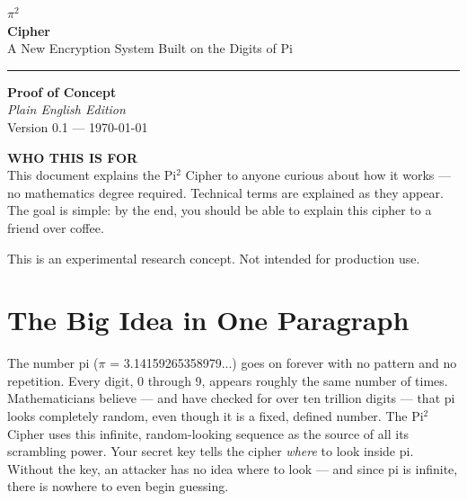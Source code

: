 \documentclass[12pt, a4paper]{article}
\begin{document}

\begin{titlepage}
\centering
\vspace*{1.8cm}

{\fontsize{52}{60}\selectfont $\pi^2$}\\[0.5em]
{\Huge\bfseries\color{pigreen} Cipher}\\[0.7em]
{\large\color{pigray} A New Encryption System Built on the Digits of Pi}

\vspace{1.2cm}
\textcolor{piborder}{\rule{0.55\linewidth}{1pt}}
\vspace{1.2cm}

{\large\textbf{Proof of Concept}}\\[0.4em]
{\large\textit{Plain English Edition}}\\[0.8em]
{\color{pigray} Version 0.1 — \today}

\vspace{1.8cm}

\begin{amberbox}
\centering\small\color{piamber}
\textbf{WHO THIS IS FOR}\\[0.4em]
\color{pigray}
This document explains the Pi$^2$ Cipher to anyone curious about how it works ---
no mathematics degree required. Technical terms are explained as they appear.
The goal is simple: by the end, you should be able to explain this cipher
to a friend over coffee.
\end{amberbox}

\vfill
{\small\color{pigray}
This is an experimental research concept. Not intended for production use.
}
\end{titlepage}

\tableofcontents
\newpage

\section{The Big Idea in One Paragraph}

\vspace{0.5em}

The number pi ($\pi$ = 3.14159265358979...) goes on forever with no pattern and no repetition. Every digit, 0 through 9, appears roughly the same number of times. Mathematicians believe --- and have checked for over ten trillion digits --- that pi looks completely random, even though it is a fixed, defined number. The Pi$^2$ Cipher uses this infinite, random-looking sequence as the source of all its scrambling power. Your secret key tells the cipher \textit{where} to look inside pi. Without the key, an attacker has no idea where to look --- and since pi is infinite, there is nowhere to even begin guessing.
\end{document}
